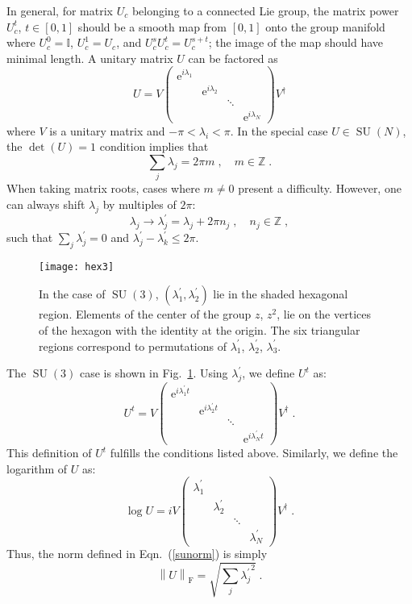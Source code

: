 \documentclass[preprint,aps,prd]{revtex4-2}
\newcommand{\da}{\dagger}  %
\newcommand{\be}{\begin{equation}}
\newcommand{\eq}{\end{equation}}
\newcommand{\integer}{\mathbb{Z}}       %
\DeclareMathOperator{\SU}{SU}
\newcommand\fnorm[1]{\left\lVert #1 \right\rVert_\mathrm{F}}
\begin{document}
In general, for matrix $U_c$ belonging to a connected Lie group,
the matrix power $U_c^t$, $t\in[0,1]$ should be a
smooth map from $[0,1]$ onto the group manifold where
$U_c^0=\mathbb{I}$, $U_c^1=U_c$, and $U_c^s U_c^t = U_c^{s+t}$;
the image of the map should have minimal length.
A unitary matrix $U$ can be factored as
%
\be
U = V \begin{pmatrix}
    \mathrm{e}^{i \lambda_1} & & &\\
    & \mathrm{e}^{i \lambda_2} & &\\
    & & \ddots & \\
    & & & \mathrm{e}^{i \lambda_N}\end{pmatrix} V^\da
\eq
%
where $V$ is a unitary matrix and $-\pi < \lambda_i < \pi$.
In the special case $U \in \SU(N)$, the $\det(U)=1$ condition implies that
\be
\sum_j \lambda_j = 2 \pi m\;, \quad m\in\integer \;.
\eq
When taking matrix roots, cases where $m\neq 0$ present a
difficulty.  However, one can always shift $\lambda_j$ by
multiples of $2\pi$:
\be
\lambda_j \to \lambda_j^\prime = \lambda_j + 2 \pi n_j\;,\quad
n_j\in\integer \; ,
\eq
such that $\sum_j \lambda_j^\prime = 0$ and
$\lambda_j^\prime - \lambda_k^\prime \le 2 \pi$.
%
\begin{figure}
\texttt{[image: hex3]}
\caption{In the case of $\SU(3)$, $(\lambda_1^\prime,\lambda_2^\prime)$
  lie in the shaded hexagonal region.
  Elements of the center of the group $z$, $z^2$, lie on the vertices
  of the hexagon with the identity at the origin.
  The six triangular regions correspond to permutations of
  $\lambda_1^\prime$, $\lambda_2^\prime$, $\lambda_3^\prime$.   \label{hexagon}}
\end{figure}
%
The $\SU(3)$ case is shown in Fig.~\ref{hexagon}.
Using $\lambda_j^\prime$, we define $U^t$ as:
\be
U^t = V \begin{pmatrix}
    \mathrm{e}^{i\lambda_1^\prime t} & & &\\
    & \mathrm{e}^{i\lambda_2^\prime t} & &\\
    & & \ddots & \\
    & & & \mathrm{e}^{i\lambda_N^\prime t}\end{pmatrix} V^\da \; .
\eq
This definition of $U^t$ fulfills the conditions listed above.
Similarly, we define the logarithm of $U$ as:
\be
\log U = i V \begin{pmatrix}
    \lambda_1^\prime & & &\\
    & \lambda_2^\prime & &\\
    & & \ddots & \\
    & & & \lambda_N^\prime\end{pmatrix} V^\da \; .
\eq
Thus, the norm defined in Eqn.~(\ref{sunorm}) is simply
\be
\fnorm{U} = \sqrt{\sum_j {\lambda_j^\prime}^2} \; .
\eq
\end{document}
